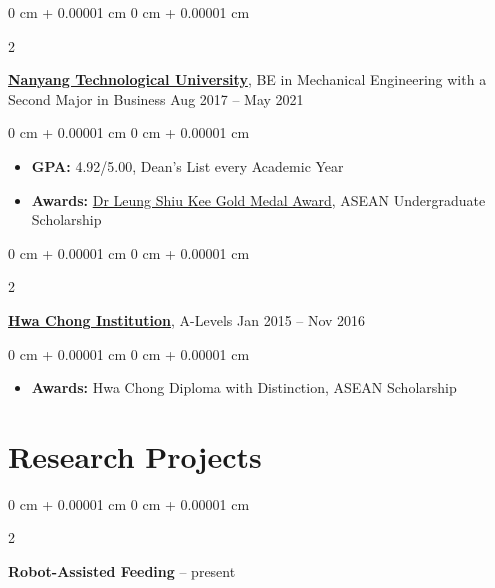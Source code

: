 \documentclass[10pt, letterpaper]{article}
\newenvironment{highlights}{
    \begin{itemize}[
        topsep=0.10 cm,
        parsep=0.10 cm,
        partopsep=0pt,
        itemsep=0pt,
        leftmargin=0 cm + 10pt
    ]
}{
    \end{itemize}
} %
\newenvironment{onecolentry}{
    \begin{adjustwidth}{
        0 cm + 0.00001 cm
    }{
        0 cm + 0.00001 cm
    }
}{
    \end{adjustwidth}
} %
\newenvironment{twocolentry}[2][]{
    \onecolentry
    \def\secondColumn{#2}
    \setcolumnwidth{\fill, 4.5 cm}
    \begin{paracol}{2}
}{
    \switchcolumn \raggedleft \secondColumn
    \end{paracol}
    \endonecolentry
} %
\begin{document}
        \begin{twocolentry}{
            Aug 2017 – May 2021
        }
            \textbf{\href{https://www.ntu.edu.sg/}{Nanyang Technological University}}, BE in Mechanical Engineering with a Second Major in Business\end{twocolentry}

        \vspace{0.10 cm}
        \begin{onecolentry}
            \begin{highlights}
                \item \textbf{GPA:} 4.92/5.00, Dean's List every Academic Year
                \item \textbf{Awards:} \href{https://www.ntu.edu.sg/mae/admissions/current-students/undergraduate/medals-and-prizes}{Dr Leung Shiu Kee Gold Medal Award}, ASEAN Undergraduate Scholarship
            \end{highlights}
        \end{onecolentry}


        \vspace{0.2 cm}

        \begin{twocolentry}{
            Jan 2015 – Nov 2016
        }
            \textbf{\href{https://www.hci.edu.sg/}{Hwa Chong Institution}}, A-Levels\end{twocolentry}

        \vspace{0.10 cm}
        \begin{onecolentry}
            \begin{highlights}
                \item \textbf{Awards:} Hwa Chong Diploma with Distinction, ASEAN Scholarship
            \end{highlights}
        \end{onecolentry}



    
    \section{Research Projects}



        
        \begin{twocolentry}{
            2022 -- present
        }
            \textbf{Robot-Assisted Feeding}\end{twocolentry}
\end{document}
